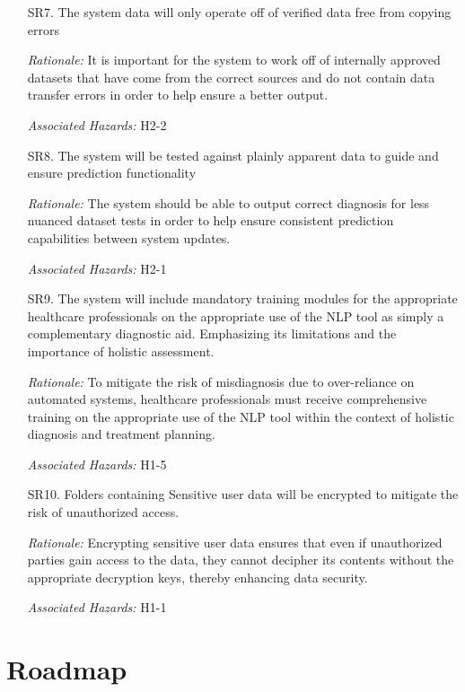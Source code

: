 \documentclass{article}
\begin{document}
\begin{enumerate}
   \item[SR7.] The system data will only operate off of verified data free from copying errors
   \item[] \emph{Rationale:} It is important for the system to work off of internally approved datasets that have come from the correct sources and do not contain data transfer errors in order to help ensure a better output.
   \item[] \emph{Associated Hazards:} H2-2 \\
   \item[SR8.] The system will be tested against plainly apparent data to guide and ensure prediction functionality
   \item[] \emph{Rationale:} The system should be able to output correct diagnosis for less nuanced dataset tests in order to help ensure consistent prediction capabilities between system updates.
   \item[] \emph{Associated Hazards:} H2-1 \\
   \item[SR9.] The system will include mandatory training modules for the appropriate healthcare professionals on the appropriate use of the NLP tool as simply a complementary diagnostic aid. Emphasizing its limitations and the importance of holistic assessment.
   \item[] \emph{Rationale:} To mitigate the risk of misdiagnosis due to over-reliance on automated systems, healthcare professionals must receive comprehensive training on the appropriate use of the NLP tool within the context of holistic diagnosis and treatment planning.
   \item[] \emph{Associated Hazards:} H1-5\\
  
   \item[SR10.] Folders containing Sensitive user data will be encrypted to mitigate the risk of unauthorized access.
   \item[] \emph{Rationale:} Encrypting sensitive user data ensures that even if unauthorized parties gain access to the data, they cannot decipher its contents without the appropriate decryption keys, thereby enhancing data security.
   \item[] \emph{Associated Hazards:} H1-1\\


\end{enumerate}


\section{Roadmap}
\end{document}
